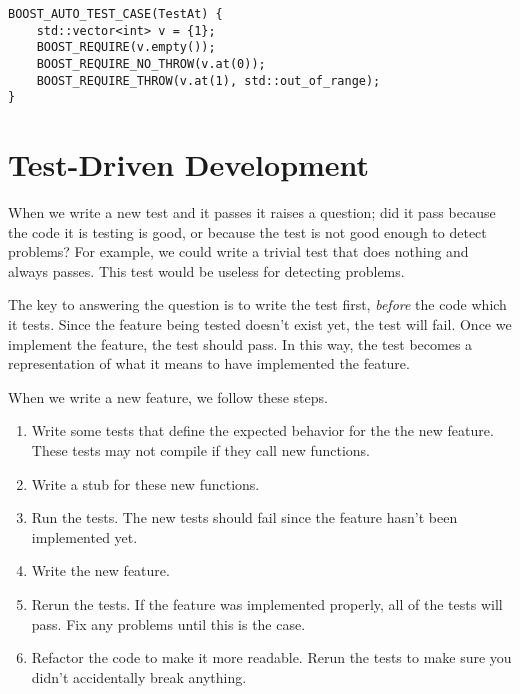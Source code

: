 \begin{lstlisting}
BOOST_AUTO_TEST_CASE(TestAt) {
	std::vector<int> v = {1};
	BOOST_REQUIRE(v.empty());
	BOOST_REQUIRE_NO_THROW(v.at(0));
	BOOST_REQUIRE_THROW(v.at(1), std::out_of_range);
}
\end{lstlisting}


\section{Test-Driven Development}\label{sec:testing-tdd}

When we write a new test and it passes it raises a question; did it pass because the code it is testing is good, or because the test is not good enough to detect problems?
For example, we could write a trivial test that does nothing and always passes.
This test would be useless for detecting problems.

The key to answering the question is to write the test first, \emph{before} the code which it tests.
Since the feature being tested doesn't exist yet, the test will fail.
Once we implement the feature, the test should pass.
In this way, the test becomes a representation of what it means to have implemented the feature.

When we write a new feature, we follow these steps.

\begin{enumerate}
	\item Write some tests that define the expected behavior for the the new feature.  These tests may not compile if they call new functions.
	\item Write a stub for these new functions.
	\item Run the tests.  The new tests should fail since the feature hasn't been implemented yet.
	\item Write the new feature.
	\item Rerun the tests.  If the feature was implemented properly, all of the tests will pass.  Fix any problems until this is the case.
	\item Refactor the code to make it more readable.  Rerun the tests to make sure you didn't accidentally break anything.
\end{enumerate}

